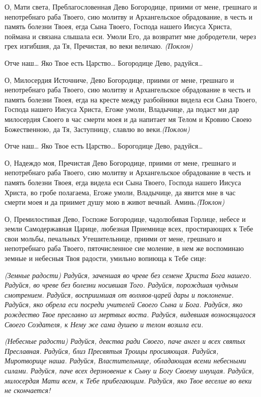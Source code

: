 О, Мати света, Преблагословенная Дево Богородице, приими от мене, грешнаго и непотребнаго раба Твоего, сию молитву и Архангельское обрадование, в честь и память болезни Твоея, егда Сына Твоего, Господа нашего Иисуса Христа, поймана и связана слышала еси. Умоли Его, да возвратит мне добродетели, через грех изгибшия, да Тя, Пречистая, во веки величаю. \itshape (Поклон)\normalfont{}




Отче наш… Яко Твое есть Царство… Богородице Дево, радуйся…

О, Милосердия Источниче, Дево Богородице, приими от мене, грешнаго и непотребнаго раба Твоего, сию молитву и Архангельское обрадование в честь и память болезни Твоея, егда на кресте между разбойники видела еси Сына Твоего, Господа нашего Иисуса Христа, Егоже умоли, Владычице, да подаст ми дар милосердия Своего в час смерти моея и да напитает мя Телом и Кровию Своею Божественною, да Тя, Заступницу, славлю во веки.\itshape  (Поклон)\normalfont{}




Отче наш… Яко Твое есть Царство… Борогодице Дево, радуйся…

О, Надеждо моя, Пречистая Дево Богородице, приими от мене, грешнаго и непотребнаго раба Твоего, сию молитву и Архангельское обрадование в честь и память болезни Твоея, егда видела еси Сына Твоего, Господа нашего Иисуса Христа, во гробе полагаема, Егоже умоли, Владычице, да явится мне в час смерти моея и да приимет душу мою в живот вечный. Аминь.\itshape  (Поклон)

\normalfont{}О, Премилостивая Дево, Госпоже Богородице, чадолюбивая Горлице, небесе и земли Самодержавная Царице, любезная Приемнице всех, простирающих к Тебе свои мольбы, печальных Утешительнице, приими от мене, грешнаго и непотребнаго раба Твоего, пяточисленное сие моление, в нем же воспоминаю земные и небесныя Твоя радости, умильно вопиюща к Тебе сице: 

\itshape (Земные радости)\normalfont{} Радуйся, заченшая во чреве без семене Христа Бога нашего. Радуйся, во чреве без болезни носившая Того. Радуйся, порождшая чудным смотрением. Радуйся, восприимшая от волхвов-царей дары и поклонение. Радуйся, яко обрела еси посреди учителей Своего Сына и Бога. Радуйся, яко рождество Твое преславно из мертвых воста. Радуйся, видевшая возносящагося Своего Создателя, к Нему же сама душею и телом возшла еси.

\itshape (Небесные радости)\normalfont{} Радуйся, девства ради Своего, паче ангел и всех святых Преславная. Радуйся, близ Пресвятыя Троицы просияющая. Радуйся, Миротворице наша. Радуйся, Властительнице, обладающая всеми небесными силами. Радуйся, паче всех дерзновение к Сыну и Богу Своему имущая. Радуйся, милосердая Мати всем, к Тебе прибегающим. Радуйся, яко Твое веселие во веки не скончается!

